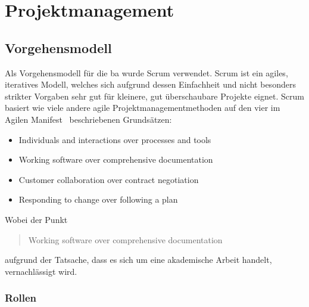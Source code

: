 \part{Projektmanagement}

\chapter{Vorgehensmodell}
Als Vorgehensmodell für die \acl{ba} wurde Scrum verwendet. Scrum ist ein agiles, iteratives Modell, welches sich aufgrund dessen Einfachheit und nicht besonders strikter Vorgaben sehr gut für kleinere, gut überschaubare Projekte eignet. Scrum basiert wie viele andere agile Projektmanagementmethoden auf den vier im Agilen Manifest~\cite{agilemanifesto} beschriebenen Grundsätzen:

\begin{itemize}
	\item Individuals and interactions over processes and tools
	\item Working software over comprehensive documentation
	\item Customer collaboration over contract negotiation
	\item Responding to change over following a plan
\end{itemize}

Wobei der Punkt \blockquote{Working software over comprehensive documentation} aufgrund der Tatsache, dass es sich um eine akademische Arbeit handelt, vernachlässigt wird.

\section{Rollen}


